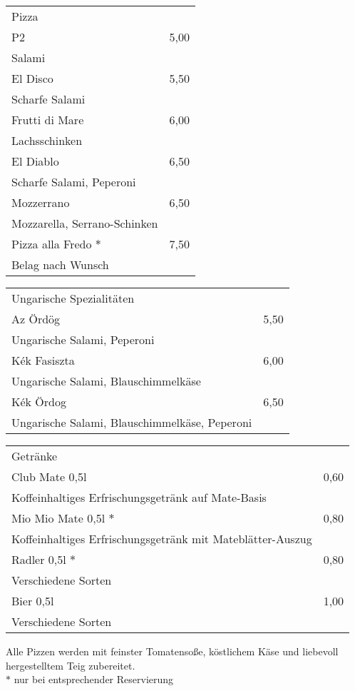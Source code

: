 \documentclass[12pt]{article}
\makeatletter
\newcommand*\ColText[1]{\textcolor{Goldenrod3}{#1}}
\newenvironment{Group}[1]
  {\noindent\begin{tabular*}{\textwidth}{@{}p{.8\linewidth}@{\extracolsep{\fill}}r@{}}
    {\fontsize{24}{29}\selectfont\ColText{#1}}\\[0.8em]}
  {\end{tabular*}}
\newcommand*\Entry[2]{%
  \sffamily#1 & #2}
\newcommand*\Expl[1]{%
  \hspace*{1em}\footnotesize #1}
\makeatother
\begin{document}
\begin{Group}{Pizza}
\Entry{P2}{5,00} \\
\Expl{Salami} \\
\Entry{El Disco}{5,50} \\
\Expl{Scharfe Salami} \\
\Entry{Frutti di Mare}{6,00} \\
\Expl{Lachsschinken} \\
\Entry{El Diablo}{6,50} \\
\Expl{Scharfe Salami, Peperoni} \\
\Entry{Mozzerrano}{6,50} \\
\Expl{Mozzarella, Serrano-Schinken} \\
\Entry{Pizza alla Fredo $\ast$}{7,50} \\
\Expl{Belag nach Wunsch} \\
\end{Group}

\vfill

\begin{Group}{Ungarische Spezialitäten}
\Entry{Az Ördög}{5,50} \\ 
\Expl{Ungarische Salami, Peperoni} \\
\Entry{Kék Fasiszta}{6,00} \\ 
\Expl{Ungarische Salami, Blauschimmelkäse} \\
\Entry{Kék Ördog}{6,50} \\ 
\Expl{Ungarische Salami, Blauschimmelkäse, Peperoni} \\ 
\end{Group}

\vfill

%

\begin{Group}{Getränke}
\Entry{Club Mate 0,5l}{0,60} \\
\Expl{Koffeinhaltiges Erfrischungsgetränk auf Mate-Basis} \\
\Entry{Mio Mio Mate 0,5l $\ast$}{0,80} \\
\Expl{Koffeinhaltiges Erfrischungsgetränk mit Mateblätter-Auszug} \\
\Entry{Radler 0,5l $\ast$}{0,80} \\
\Expl{Verschiedene Sorten} \\
\Entry{Bier 0,5l}{1,00} \\
\Expl{Verschiedene Sorten} \\
\end{Group}

\vfill

\noindent \small Alle Pizzen werden mit feinster Tomatensoße, köstlichem Käse und liebe\-voll hergestelltem  Teig zubereitet.\\
$\ast$ nur bei entsprechender Reservierung
\end{document}
